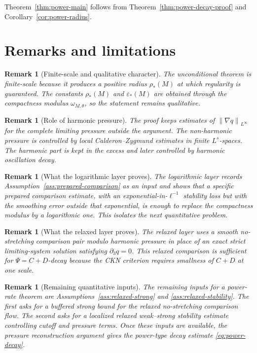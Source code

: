 \documentclass[pdflatex,sn-mathphys-num]{sn-jnl}
\numberwithin{equation}{section}
\theoremstyle{thmstyleone}
\theoremstyle{thmstylethree}
\newtheorem{remark}[theorem]{Remark}
\newcommand{\eps}{\varepsilon}
\newcommand{\norm}[2]{\left\|#1\right\|_{#2}}
\begin{document}
Theorem~\ref{thm:power-main} follows from Theorem~\ref{thm:power-decay-proof} and Corollary~\ref{cor:power-radius}.

\section{Remarks and limitations}
\label{sec:remarks}

\begin{remark}[Finite-scale and qualitative character]
The unconditional theorem is finite-scale because it produces a positive radius \(\rho_*(M)\) at which regularity is guaranteed.  The constants \(\rho_*(M)\) and \(\eps_*(M)\) are obtained through the compactness modulus \(\omega_{M,\theta}\), so the statement remains qualitative.
\end{remark}

\begin{remark}[Role of harmonic pressure]
The proof keeps estimates of \(\norm{\nabla q}{L^\infty}\) for the complete limiting pressure outside the argument.  The non-harmonic pressure is controlled by local Calderon--Zygmund estimates in finite \(L^s\)-spaces.  The harmonic part is kept in the excess and later controlled by harmonic oscillation decay.
\end{remark}

\begin{remark}[What the logarithmic layer proves]
The logarithmic layer records Assumption~\ref{ass:prepared-comparison} as an input and shows that a specific prepared comparison estimate, with an exponential-in-\(\ell^{-1}\) stability loss but with the smoothing error outside that exponential, is enough to replace the compactness modulus by a logarithmic one.  This isolates the next quantitative problem.
\end{remark}

\begin{remark}[What the relaxed layer proves]
The relaxed layer uses a smooth no-stretching comparison pair modulo harmonic pressure in place of an exact strict limiting-system solution satisfying \(\partial_3q=0\).  This relaxed comparison is sufficient for \(\Psi=C+D\)-decay because the CKN criterion requires smallness of \(C+D\) at one scale.
\end{remark}

\begin{remark}[Remaining quantitative inputs]
The remaining inputs for a power-rate theorem are Assumptions~\ref{ass:relaxed-strong} and \ref{ass:relaxed-stability}.  The first asks for a buffered strong bound for the relaxed no-stretching comparison flow.  The second asks for a localized relaxed weak--strong stability estimate controlling cutoff and pressure terms.  Once these inputs are available, the pressure reconstruction argument gives the power-type decay estimate \eqref{eq:power-decay}.
\end{remark}
\end{document}
